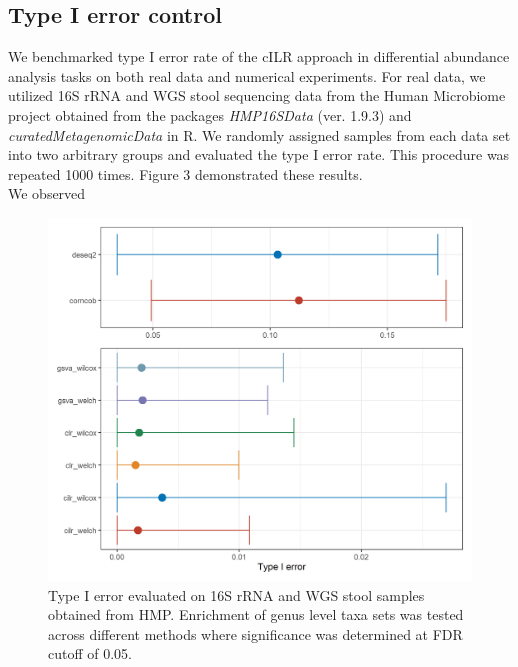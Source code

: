 \documentclass{article}
\begin{document}
\subsection*{Type I error control}
We benchmarked type I error rate of the cILR approach in differential abundance analysis tasks on both real data and numerical experiments. For real data, we utilized 16S rRNA and WGS stool sequencing data from the Human Microbiome project obtained from the packages \emph{HMP16SData} (ver. 1.9.3) and \emph{curatedMetagenomicData} in R. We randomly assigned samples from each data set into two arbitrary groups and evaluated the type I error rate. This procedure was repeated 1000 times. Figure 3 demonstrated these results.\\
We observed 
\begin{figure}[H]
    \centering
    \includegraphics[scale=0.5]{figures/null_16s_da.png}
    \caption{Type I error evaluated on 16S rRNA and WGS stool samples obtained from HMP. Enrichment of genus level taxa sets was tested across different methods where significance was determined at FDR cutoff of 0.05.}
\end{figure}

\newpage
{}

\end{document}
